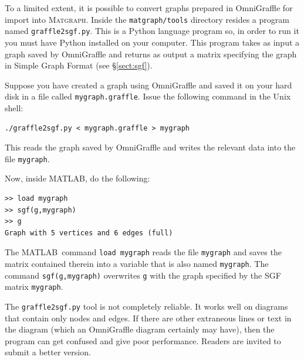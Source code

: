 \documentclass[12pt]{amsart}
\newcommand\matlab{MATLAB}
\newcommand\matgraph{\textsc{Matgraph}}
\begin{document}
To a limited extent, it is possible to convert graphs prepared in
OmniGraffle for import into \matgraph. Inside the
\verb|matgraph/tools| directory resides a program named
\verb|graffle2sgf.py|. This is a Python language program so, in order
to run it you must have Python installed on your computer.  This
program takes as input a graph saved by OmniGraffle and returns as
output a matrix specifying the graph in Simple Graph Format (see
\S\ref{sect:sgf}).

Suppose you have created a graph using OmniGraffle and saved it on
your hard disk in a 
file called \verb|mygraph.graffle|. Issue the following command in the
Unix shell:
\begin{verbatim}
./graffle2sgf.py < mygraph.graffle > mygraph
\end{verbatim}
This reads the graph saved by OmniGraffle and writes the relevant data
into the file \verb|mygraph|.

Now, inside \matlab, do the following:
\begin{verbatim}
>> load mygraph
>> sgf(g,mygraph)
>> g
Graph with 5 vertices and 6 edges (full)
\end{verbatim}
The \matlab\ command \verb|load mygraph| reads the file \verb|mygraph|
and saves the matrix contained therein into a variable that is also
named \verb|mygraph|. The command \verb|sgf(g,mygraph)| overwrites
\verb|g| with the graph specified by the SGF matrix \verb|mygraph|. 

The \verb|graffle2sgf.py| tool is not completely reliable. It works
well on diagrams that contain only nodes and edges. If there are other
extraneous lines or text in the diagram (which an OmniGraffle diagram
certainly may have), then the program can get confused and give poor
performance. Readers are invited to submit a better version.
\end{document}
